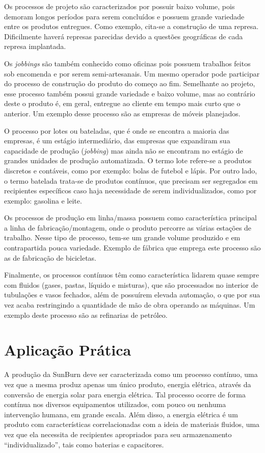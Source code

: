 Os processos de projeto são caracterizados por possuir baixo volume, pois demoram longos períodos para serem concluídos e possuem grande variedade entre os produtos entregues. Como exemplo, cita-se a construção de uma represa. Dificilmente haverá represas parecidas devido a questões geográficas de cada represa implantada.

Os \textit{jobbings} são também conhecido como oficinas pois possuem trabalhos feitos sob encomenda e por serem semi-artesanais. Um mesmo operador pode participar do processo de construção do produto do começo ao fim. Semelhante ao projeto, esse processo também possui grande variedade e baixo volume, mas ao contrário deste o produto é, em geral, entregue ao cliente em tempo mais curto que o anterior. Um exemplo desse processo são as empresas de móveis planejados.

O processo por lotes ou bateladas, que é onde se encontra a maioria das empresas, é um estágio intermediário, das empresas que expandiram sua capacidade de produção (\textit{jobbing}) mas ainda não se encontram no estágio de grandes unidades de produção automatizada. O termo lote refere-se a produtos discretos e contáveis, como por exemplo: bolas de futebol e lápis. Por outro lado, o termo batelada trata-se de produtos contínuos, que precisam ser segregados em recipientes específicos caso haja necessidade de serem individualizados, como por exemplo: gasolina e leite.

Os processos de produção em linha/massa possuem como característica principal a linha de fabricação/montagem, onde o produto percorre as várias estações de trabalho. Nesse tipo de processo, tem-se um grande volume produzido e em contrapartida pouca variedade. Exemplo de fábrica que emprega este processo são as de fabricação de bicicletas.

Finalmente, os processos contínuos têm como característica lidarem quase sempre com fluidos (gases, pastas, líquido e misturas), que são processados no interior de tubulações e vasos fechados, além de possuírem elevada automação, o que por sua vez acaba restringindo a quantidade de mão de obra operando as máquinas. Um exemplo deste processo são as refinarias de petróleo.


\section{Aplicação Prática}
\label{sec:tipos_de_processo_de_producao_aplicacao}

A produção da SunBurn deve ser caracterizada como um processo contínuo, uma vez que a mesma produz apenas um único produto, energia elétrica, através da conversão de energia solar para energia elétrica. Tal processo ocorre de forma contínua nos diversos equipamentos utilizados, com pouco ou nenhuma intervenção humana, em grande escala. Além disso, a energia elétrica é um produto com características correlacionadas com a ideia de materiais fluidos, uma vez que ela necessita de recipientes apropriados para seu armazenamento ``individualizado'', tais como baterias e capacitores.


